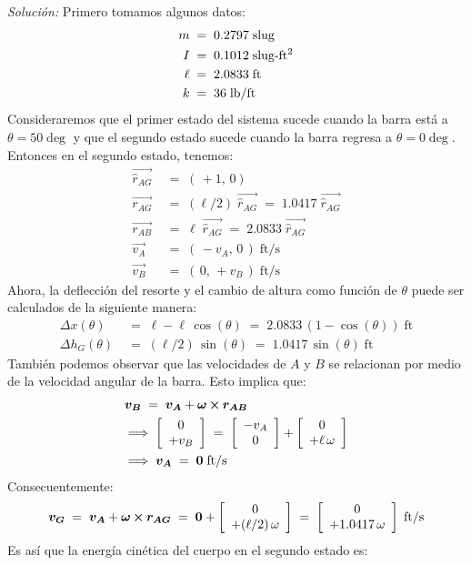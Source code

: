 \documentclass[ a4paper, twoside, 11pt]{article}
\begin{document}
\begin{problem}
\emph{Soluci\'on:} Primero tomamos algunos datos: 
\begin{align*}
m \; & = \; 0.2797 \; \text{slug} \\
I \; & = \; 0.1012 \; \text{slug-ft\ensuremath{^{\text{2}}}} \\
\ell \; & = \; 2.0833 \; \text{ft} \\
k \; & = \; 36 \; \text{lb/ft}
\end{align*}
Consideraremos que el primer estado del sistema sucede cuando la barra est\'a a $\theta = 50\deg$ y que el segundo estado sucede cuando la barra regresa a $\theta = 0\deg$. Entonces en el segundo estado, tenemos: 
\begin{align*}
\vec{\hat{r}_{AG}} \; & = \; ( \, +1, \, 0 ) \\
\vec{r_{AG}} \; & = \; (\ell/2) \; \vec{\hat{r}_{AG}} \; = \;
1.0417 \; \vec{\hat{r}_{AG}} \\
\vec{r_{AB}} \; & = \; \ell \; \vec{\hat{r}_{AG}} \; = \;
2.0833 \; \vec{\hat{r}_{AG}} \\
\vec{v_A} \; & = \; ( \, -v_A, \, 0 \, ) \; \text{ft/s} \\
\vec{v_B} \; & = \; ( \, 0, \, +v_B \, ) \; \text{ft/s}
\end{align*}
Ahora, la deflecci\'on del resorte y el cambio de altura como funci\'on de $\theta$ puede ser calculados de la siguiente manera: 
\begin{align*}
\Delta x(\theta) \;
& = \; \ell - \ell \, \cos(\theta) \; = \; 
2.0833 \, ( 1 - \cos(\theta) ) \; \text{ft} \\
\Delta h_G(\theta) \;
& = \; (\ell/2) \, \sin(\theta)
\; = \; 1.0417 \, \sin(\theta) \; \text{ft}
\end{align*}
Tambi\'en podemos observar que las velocidades de $A$ y $B$ se relacionan por medio de la velocidad angular de la barra. Esto implica que: 
\begin{align*}
& {\boldsymbol{v_B}} \; = \;
{\boldsymbol{v_A}} + {\boldsymbol{\omega}} \,{\boldsymbol{\times}}\, {\boldsymbol{r_{AB}}} \\
& \Longrightarrow \;
\left[ \begin{array}{c} 0 \\ +v_B \end{array} \right] \; = \; 
\left[ \begin{array}{c} -v_A \\ 0 \end{array} \right] + \left[ \begin{array}{c} 0 \\  +\ell \, \omega \end{array} \right] \\
& \Longrightarrow \;
{\boldsymbol{v_A}} \; = \; {\boldsymbol{0}} \; \text{ft/s}
\end{align*}
Consecuentemente: 
\[
{\boldsymbol{v_G}} \; = \;
{\boldsymbol{v_A}} + {\boldsymbol{\omega}} \,{\boldsymbol{\times}}\, {\boldsymbol{r_{AG}}} \; = \;
{\boldsymbol{0}} + \left[ \begin{array}{c} 0 \\  +(\ell/2) \, \omega \end{array} \right] \; = \;
\left[ \begin{array}{c} 0 \\  +1.0417 \, \omega \end{array} \right] \; \text{ft/s}
\]
Es as\'i que la energ\'ia cin\'etica del cuerpo en el segundo estado es: 
\begin{align*}

\end{align*}
\end{problem}
\end{document}
